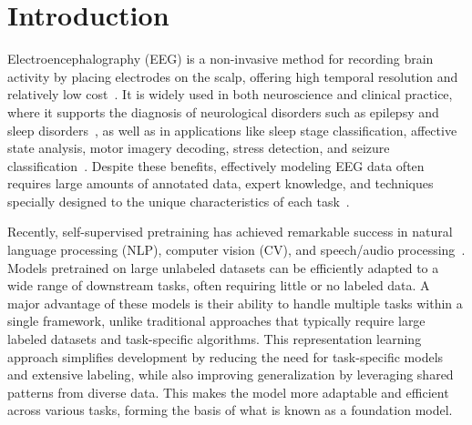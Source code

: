 \documentclass{article} %
\begin{document}
\vspace{-0.4cm}
\section{Introduction}
Electroencephalography (EEG) is a non-invasive method for recording brain activity by placing electrodes on the scalp, offering high temporal resolution and relatively low cost~\citep{EEG2002,EEG2020}. It is widely used in both neuroscience and clinical practice, where it supports the diagnosis of neurological disorders such as epilepsy and sleep disorders~\citep{EEG18App, EEG20seizure}, as well as in applications like sleep stage classification, affective state analysis, motor imagery decoding, stress detection, and seizure classification~\citep{EEG19App,EEG20App,rakovic2024measuring}. Despite these benefits, effectively modeling EEG data often requires large amounts of annotated data, expert knowledge, and techniques specially designed to the unique characteristics of each task~\citep{weng2024self}.

Recently, self-supervised pretraining has achieved remarkable success in natural language processing (NLP), computer vision (CV), and speech/audio processing~\citep{bommasani2021opportunities,yu2022coca,chen2024vast}. Models pretrained on large unlabeled datasets can be efficiently adapted to a wide range of downstream tasks, often requiring little or no labeled data. A major advantage of these models is their ability to handle multiple tasks within a single framework, unlike traditional approaches that typically require large labeled datasets and task-specific algorithms. This representation learning approach simplifies development by reducing the need for task-specific models and extensive labeling, while also improving generalization by leveraging shared patterns from diverse data. This makes the model more adaptable and efficient across various tasks, forming the basis of what is known as a foundation model.
\end{document}
